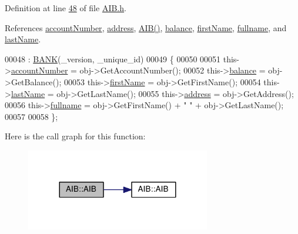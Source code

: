 Definition at line \hyperlink{_a_i_b_8h_source_l00048}{48} of file \hyperlink{_a_i_b_8h_source}{A\+I\+B.\+h}.



References \hyperlink{_a_i_b_8h_source_l00099}{account\+Number}, \hyperlink{_a_i_b_8h_source_l00101}{address}, \hyperlink{_a_i_b_8h_source_l00023}{A\+I\+B()}, \hyperlink{_a_i_b_8h_source_l00100}{balance}, \hyperlink{_a_i_b_8h_source_l00097}{first\+Name}, \hyperlink{_a_i_b_8h_source_l00096}{fullname}, and \hyperlink{_a_i_b_8h_source_l00098}{last\+Name}.


\begin{DoxyCode}
00048                                                               : \hyperlink{class_b_a_n_k_a0bc938356cebff14fb0560264abe5a34_a0bc938356cebff14fb0560264abe5a34}{BANK}(\_version, \_unique\_id)
00049     \{
00050         
00051         this->\hyperlink{class_a_i_b_aafc08efeec5b8c800c32ee32f20603a7_aafc08efeec5b8c800c32ee32f20603a7}{accountNumber} = obj->GetAccountNumber();
00052         this->\hyperlink{class_a_i_b_a3c8d637bd997c1f062d844a88e2559ba_a3c8d637bd997c1f062d844a88e2559ba}{balance} = obj->GetBalance();
00053         this->\hyperlink{class_a_i_b_a869f72057cb63ebf0cfd257069e15c7c_a869f72057cb63ebf0cfd257069e15c7c}{firstName} = obj->GetFirstName();
00054         this->\hyperlink{class_a_i_b_ace7b8b648d1b44b7ee2f4be002952b7a_ace7b8b648d1b44b7ee2f4be002952b7a}{lastName} = obj->GetLastName();
00055         this->\hyperlink{class_a_i_b_ae6a67cc33d1e5fa83a52a238e45ca3dc_ae6a67cc33d1e5fa83a52a238e45ca3dc}{address} = obj->GetAddress();
00056         this->\hyperlink{class_a_i_b_a818b0cc283af23127c067fb3fc751058_a818b0cc283af23127c067fb3fc751058}{fullname} = obj->GetFirstName() + \textcolor{stringliteral}{" "} + obj->GetLastName(); 
00057         
00058     \};
\end{DoxyCode}


Here is the call graph for this function\+:
\nopagebreak
\begin{figure}[H]
\begin{center}
\leavevmode
\includegraphics[width=228pt]{class_a_i_b_aa0faccb7aadf423d12bddb2469ff5053_aa0faccb7aadf423d12bddb2469ff5053_cgraph}
\end{center}
\end{figure}


